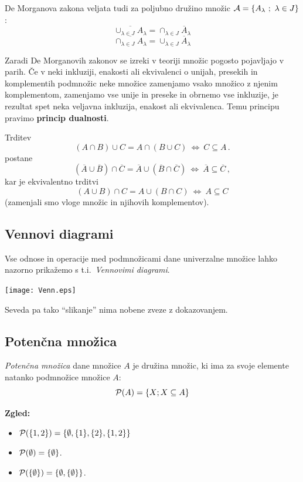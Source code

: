 \documentclass[11pt,paper=b5,footinclude,headinclude]{scrbook} %
\newcounter{example}
\def\cee {{~\Leftrightarrow~}}
\begin{document}
De Morganova zakona veljata tudi za poljubno družino množic ${\cal A} = \{A_\lambda~;~\lambda\in J\}$:
$$\overline{\cup_{\lambda\in J}A_\lambda} = {\cap_{\lambda\in J}\overline A_\lambda}$$
$$\overline{\cap_{\lambda\in J}A_\lambda} = {\cup_{\lambda\in J}\overline A_\lambda}$$

Zaradi De Morganovih zakonov se izreki v teoriji množic pogosto pojavljajo v parih.
Če v neki inkluziji, enakosti ali ekvivalenci o unijah, presekih in komplementih podmnožic neke množice zamenjamo vsako množico z njenim komplementom,
zamenjamo vse unije in preseke in obrnemo vse inkluzije, je rezultat spet neka veljavna inkluzija, enakost ali ekvivalenca. Temu principu pravimo \textbf{ princip dualnosti}.


\bigskip
\begin{example*}

Trditev
$$(A\cap B)\cup C = A\cap (B\cup C) \cee C\subseteq A\,.$$
postane
$$(\overline A\cup \overline B)\cap \overline C = \overline A\cup (\overline B\cap \overline C) \cee \overline A\subseteq \overline C\,,$$
kar je ekvivalentno trditvi
$$(A\cup B)\cap C = A\cup (B\cap C) \cee A\subseteq C$$
(zamenjali smo vloge množic in njihovih komplementov).
\end{example*}

\subsection{Vennovi diagrami}

Vse odnose in operacije med podmnožicami dane univerzalne množice lahko nazorno prikažemo s t.i.~{\em Vennovimi diagrami}.


\begin{center}
\texttt{[image: Venn.eps]}
\end{center}

\medskip
Seveda pa tako ``slikanje'' nima nobene zveze z dokazovanjem.

\subsection{Potenčna množica}

{\em Potenčna množica} dane množice $A$ je družina množic, ki ima za svoje elemente natanko podmnožice množice $A$:
$${\cal P}(A) = \{X; X\subseteq A\}$$

\textbf{ Zgled:}
\begin{itemize}
  \item ${\cal P}(\{1,2\}) = \{\emptyset, \{1\},\{2\},\{1,2\}\}$
  \item ${\cal P}(\emptyset) = \{\emptyset\}$.
  \item ${\cal P}(\{\emptyset\}) = \{\emptyset, \{\emptyset\}\}$.
\end{itemize}
\end{document}
